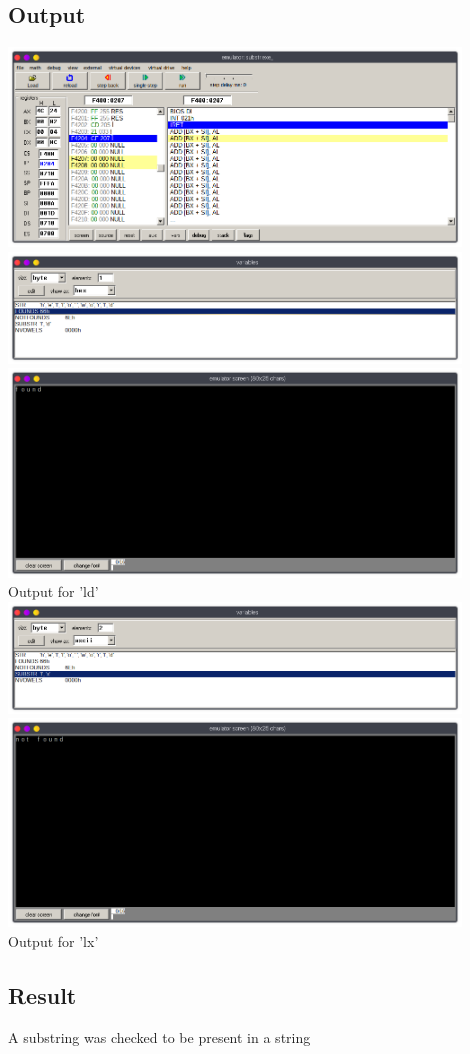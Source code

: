 \subsection{Output}
\begin{center}
	\includegraphics[width=0.90\textwidth]{img/p19/ss1.png}
	\includegraphics[width=0.90\textwidth]{img/p19/ss2.png}
	\includegraphics[width=0.90\textwidth]{img/p19/ss3.png} \\
	Output for 'ld'\\
	\includegraphics[width=0.90\textwidth]{img/p19/ss4.png}
	\includegraphics[width=0.90\textwidth]{img/p19/ss5.png} \\
	Output for 'lx'
\end{center}

\subsection{Result}
A substring was checked to be present in a string


